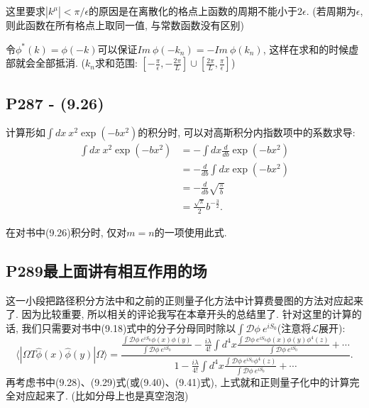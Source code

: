这里要求$|k^{\mu}| < \pi/\epsilon$的原因是在离散化的格点上函数的周期不能小于$2\epsilon$.
(若周期为$\epsilon$, 则此函数在所有格点上取同一值, 与常数函数没有区别)

令$\phi^*(k) = \phi(-k)$可以保证$Im\ \phi(-k_n) = -Im\ \phi(k_n)$, 这样在求和的时候虚部就会全部抵消.
($k_n$求和范围: $[-\frac{\pi}{\epsilon}, -\frac{2\pi}{L}]\cup [\frac{2\pi}{L}, \frac{\pi}{\epsilon}]$)

\subsection{P287 - (9.26)}

计算形如$\int dx\ x^2 \exp(-bx^2)$的积分时, 可以对高斯积分内指数项中的系数求导:
\begin{equation}
  \begin{aligned}
    \int dx\ x^2 \exp(-bx^2) & = -\int dx \frac{d}{db}\exp(-bx^2)      \\
                             & = -\frac{d}{db} \int dx \exp(-bx^2)     \\
                             & = -\frac{d}{db} \sqrt{\frac{\pi}{b}}    \\
                             & = \frac{\sqrt{\pi}}{2}b^{-\frac{3}{2}}.
  \end{aligned}
\end{equation}

在对书中(9.26)积分时, 仅对$m=n$的一项使用此式.

\subsection{P289最上面讲有相互作用的场}
这一小段把路径积分方法中和之前的正则量子化方法中计算费曼图的方法对应起来了.
因为比较重要, 所以相关的评论我写在本章开头的总结里了.
针对这里的计算的话, 我们只需要对书中(9.18)式中的分子分母同时除以$\int \mathcal{D}\phi\ e^{iS_0}$(注意将$\mathcal{L}$展开):
\begin{equation}
  \langle | \Omega T \hat{\phi}(x) \hat{\phi}(y) | \Omega \rangle = \frac{\frac{\int \mathcal{D}\phi\ e^{iS_0} \phi(x)\phi(y)}{\int \mathcal{D}\phi\ e^{iS_0}} - \frac{i\lambda}{4!}\int d^4x \frac{\int \mathcal{D}\phi\ e^{iS_0} \phi(x)\phi(y)\phi^4(z)}{\int \mathcal{D}\phi\ e^{iS_0}}+\cdots}{1 - \frac{i\lambda}{4!}\int d^4x \frac{\int \mathcal{D}\phi\ e^{iS_0} \phi^4(z)}{\int \mathcal{D}\phi\ e^{iS_0}}+\cdots}.
\end{equation}
再考虑书中(9.28)、(9.29)式(或(9.40)、(9.41)式), 上式就和正则量子化中的计算完全对应起来了. (比如分母上也是真空泡泡)


